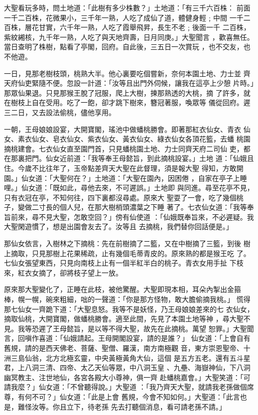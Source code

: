 \begin{pinyinscope}
{大聖看玩多時，問土地道：「此樹有多少株數？」土地道：「有三千六百株：
前面一千二百株，花微果小，三千年一熟，人吃了成仙了道，體健身輕﹔中間
一千二百株，層花甘實，六千年一熟，人吃了霞舉飛昇，長生不老﹔後面一千
二百株，紫紋緗核，九千年一熟，人吃了與天地齊壽，日月同庚。」大聖聞言
，歡喜無任。當日查明了株樹，點看了亭閣，回府。自此後，三五日一次賞玩
，也不交友，也不他遊。

一日，見那老樹枝頭，桃熟大半。他心裏要吃個嘗新，奈何本園土地、力士並
齊天府仙吏緊隨不便。忽設一計道：「汝等且出門外伺候，讓我在這亭上少憩
片時。」那眾仙果退。只見那猴王脫了冠服，爬上大樹，揀那熟透的大桃，摘
了許多，就在樹枝上自在受用。吃了一飽，卻才跳下樹來，簪冠著服，喚眾等
儀從回府。遲三二日，又去設法偷桃，儘他享用。

一朝，王母娘娘設宴，大開寶閣，瑤池中做蟠桃勝會。即著那紅衣仙女、青衣
仙女、素衣仙女、皂衣仙女、紫衣仙女、黃衣仙女、綠衣仙女各頂花籃，去蟠
桃園摘桃建會。七衣仙女直至園門首，只見蟠桃園土地、力士同齊天府二司仙
吏，都在那裏把門。仙女近前道：「我等奉王母懿旨，到此摘桃設宴。」土地
道：「仙娥且住。今歲不比往年了，玉帝點差齊天大聖在此督理，須是報大聖
得知，方敢開園。」仙女道：「大聖何在？」土地道：「大聖在園內，因困倦
，自家在亭子上睡哩。」仙女道：「既如此，尋他去來，不可遲誤。」土地即
與同進。尋至花亭不見，只有衣冠在亭，不知何往，四下裏都沒尋處。原來大
聖耍了一會，吃了幾個桃子，變做二寸長的個人兒，在那大樹梢頭濃葉之下睡
著了。七衣仙女道：「我等奉旨前來，尋不見大聖，怎敢空回？」傍有仙使道
：「仙娥既奉旨來，不必遲疑。我大聖閑遊慣了，想是出園會友去了。汝等且
去摘桃，我們替你回話便是。」

那仙女依言，入樹林之下摘桃：先在前樹摘了二籃，又在中樹摘了三籃，到後
樹上摘取，只見那樹上花果稀疏，止有幾個毛蒂青皮的。原來熟的都是猴王吃
了。七仙女張望東西，只見向南枝上止有一個半紅半白的桃子。青衣女用手扯
下枝來，紅衣女摘了，卻將枝子望上一放。

原來那大聖變化了，正睡在此枝，被他驚醒。大聖即現本相，耳朵內掣出金箍
棒，幌一幌，碗來粗細，咄的一聲道：「你是那方怪物，敢大膽偷摘我桃。」
慌得那七仙女一齊跪下道：「大聖息怒。我等不是妖怪，乃王母娘娘差來的七
衣仙女，摘取仙桃，大開寶閣，做蟠桃勝會。適至此間，先見了本園土地等神
，尋大聖不見。我等恐遲了王母懿旨，是以等不得大聖，故先在此摘桃。萬望
恕罪。」大聖聞言，回嗔作喜道：「仙娥請起。王母開閣設宴，請的是誰？」
仙女道：「上會自有舊規，請的是西天佛老、菩薩、聖僧、羅漢，南方南極觀
音，東方崇恩聖帝、十洲三島仙翁，北方北極玄靈，中央黃極黃角大仙，這個
是五方五老。還有五斗星君，上八洞三清、四帝、太乙天仙等眾，中八洞玉皇
、九壘、海嶽神仙，下八洞幽冥教主、注世地仙，各宮各殿大小尊神，俱一齊
赴蟠桃嘉會。」大聖笑道：「可請我麼？」仙女道：「不曾聽得說。」大聖道
：「我乃齊天大聖，就請我老孫做個席尊，有何不可？」仙女道：「此是上會
舊規，今會不知如何。」大聖道：「此言也是，難怪汝等。你且立下，待老孫
先去打聽個消息，看可請老孫不請。」

}
\end{pinyinscope}
